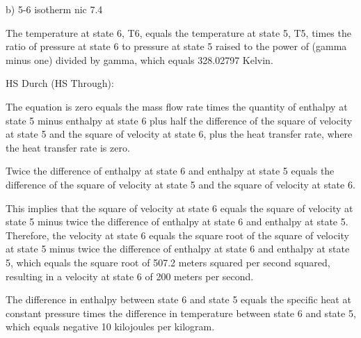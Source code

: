 b) 5-6 isotherm nic 7.4

The temperature at state 6, T6, equals the temperature at state 5, T5, times the ratio of pressure at state 6 to pressure at state 5 raised to the power of (gamma minus one) divided by gamma, which equals 328.02797 Kelvin.

HS Durch (HS Through):

The equation is zero equals the mass flow rate times the quantity of enthalpy at state 5 minus enthalpy at state 6 plus half the difference of the square of velocity at state 5 and the square of velocity at state 6, plus the heat transfer rate, where the heat transfer rate is zero.

Twice the difference of enthalpy at state 6 and enthalpy at state 5 equals the difference of the square of velocity at state 5 and the square of velocity at state 6.

This implies that the square of velocity at state 6 equals the square of velocity at state 5 minus twice the difference of enthalpy at state 6 and enthalpy at state 5. Therefore, the velocity at state 6 equals the square root of the square of velocity at state 5 minus twice the difference of enthalpy at state 6 and enthalpy at state 5, which equals the square root of 507.2 meters squared per second squared, resulting in a velocity at state 6 of 200 meters per second.

The difference in enthalpy between state 6 and state 5 equals the specific heat at constant pressure times the difference in temperature between state 6 and state 5, which equals negative 10 kilojoules per kilogram.